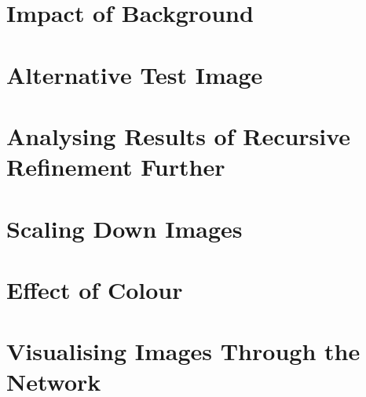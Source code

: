 \section{Impact of Background}
\label{background}


\section{Alternative Test Image}
\label{alternative}


\section{Analysing Results of Recursive Refinement Further}
\label{rrAnalyse}


\section{Scaling Down Images}
\label{scale}


\section{Effect of Colour}
\label{colour}


\section{Visualising Images Through the Network}
\label{visualise}


